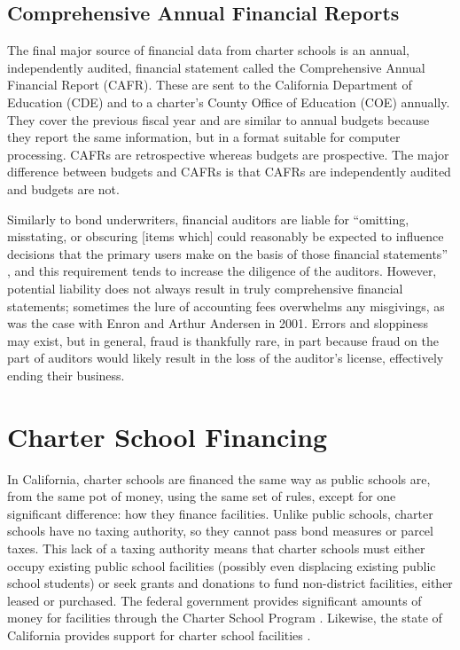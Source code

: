 \subsection{Comprehensive Annual Financial Reports}\label{sec:CAFRs}%

The final major source of financial data from charter schools is an annual, independently audited, financial statement called the Comprehensive Annual Financial Report (CAFR). These are sent to the California Department of Education (CDE) and to a charter's County Office of Education (COE) annually. They cover the previous fiscal year and are similar to annual budgets because they report the same information, but in a format suitable for computer processing. CAFRs are retrospective whereas budgets are prospective. The major difference between budgets and CAFRs is that CAFRs are independently audited and budgets are not. 

Similarly to bond underwriters, financial auditors are liable for ``omitting, misstating, or obscuring [items which] could reasonably be expected to influence decisions that the primary users make on the basis of those financial statements'' \parencite{Cayamanda2020}, and this requirement tends to increase the diligence of the auditors. However, potential liability does not always result in truly comprehensive financial statements; sometimes the lure of accounting fees overwhelms any misgivings, as was the case with Enron and Arthur Andersen in 2001. Errors and sloppiness may exist, but in general, fraud is thankfully rare, in part because fraud on the part of auditors would likely result in the loss of the auditor's license, effectively ending their business. 

\section{Charter School Financing}\label{sec:charter-school-financing}%

In California, charter schools are financed the same way as public schools are, from the same pot of money, using the same set of rules, except for one significant difference: how they finance facilities. Unlike public schools, charter schools have no taxing authority, so they cannot pass bond measures or parcel taxes. This lack of a taxing authority means that charter schools must either occupy existing public school facilities (possibly even displacing existing public school students) or seek grants and donations to fund non-district facilities, either leased or purchased. The federal government provides significant amounts of money for facilities through the Charter School Program \parencite[0–10]{NCSRC2020}. Likewise, the state of California provides support for charter school facilities \parencite[114]{Aguinaldo.etal2023}.

